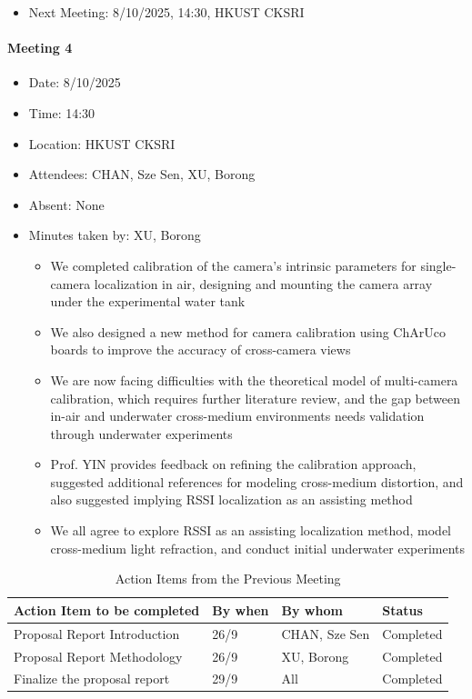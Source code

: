 \documentclass[11pt]{article}
\begin{document}
    \begin{itemize}
        \item Next Meeting: 8/10/2025, 14:30, HKUST CKSRI
    \end{itemize}
    \newpage
    \paragraph{Meeting 4}
    \begin{itemize}
        \item Date: 8/10/2025
        \item Time: 14:30
        \item Location: HKUST CKSRI
        \item Attendees: CHAN, Sze Sen, XU, Borong
        \item Absent: None
        \item Minutes taken by: XU, Borong
        \begin{itemize}
            \item We completed calibration of the camera's intrinsic parameters for single-camera localization in air, designing and mounting the camera array under the experimental water tank
            \item We also designed a new method for camera calibration using ChArUco boards to improve the accuracy of cross-camera views
            \item We are now facing difficulties with the theoretical model of multi-camera calibration, which requires further literature review, and the gap between in-air and underwater cross-medium environments needs validation through underwater experiments
            \item Prof. YIN provides feedback on refining the calibration approach,  suggested additional references for modeling cross-medium distortion, and also suggested implying RSSI localization as an assisting method
            \item We all agree to explore RSSI as an assisting localization method, model cross-medium light refraction, and conduct initial underwater experiments
        \end{itemize}
    \end{itemize}
    \begin{longtable}[c]{|l|l|l|l|}
        \caption{Action Items from the Previous Meeting}\\
        \hline
        \textbf{Action Item to be completed} & \textbf{By when} & \textbf{By whom} & \textbf{Status} \\
        \hline
        \endhead
        Proposal Report Introduction & 26/9 & CHAN, Sze Sen & Completed \\
        \hline
        Proposal Report Methodology & 26/9 & XU, Borong & Completed \\
        \hline
        Finalize the proposal report & 29/9 & All & Completed \\
        \hline
    \end{longtable}
\end{document}
